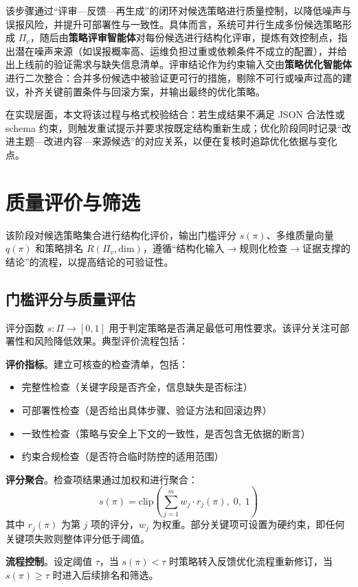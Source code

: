 该步骤通过“评审—反馈—再生成”的闭环对候选策略进行质量控制，以降低噪声与误报风险，并提升可部署性与一致性。具体而言，系统可并行生成多份候选策略形成 $\Pi_v$，随后由\textbf{策略评审智能体}对每份候选进行结构化评审，提炼有效控制点，指出潜在噪声来源（如误报概率高、运维负担过重或依赖条件不成立的配置），并给出上线前的验证需求与缺失信息清单。评审结论作为约束输入交由\textbf{策略优化智能体}进行二次整合：合并多份候选中被验证更可行的措施，剔除不可行或噪声过高的建议，补齐关键前置条件与回滚方案，并输出最终的优化策略。

在实现层面，本文将该过程与格式校验结合：若生成结果不满足 JSON 合法性或 schema 约束，则触发重试提示并要求按既定结构重新生成；优化阶段同时记录“改进主题—改进内容—来源候选”的对应关系，以便在复核时追踪优化依据与变化点。

\section{质量评价与筛选}

该阶段对候选策略集合进行结构化评价，输出门槛评分 $s(\pi)$、多维质量向量 $q(\pi)$ 和策略排名 $R(\Pi_v, \text{dim})$，遵循“结构化输入$\to$规则化检查$\to$证据支撑的结论”的流程，以提高结论的可验证性。

\subsection{门槛评分与质量评估}

评分函数 $s: \Pi \to [0,1]$ 用于判定策略是否满足最低可用性要求。该评分关注可部署性和风险降低效果。典型评价流程包括：

	\textbf{评价指标}。建立可核查的检查清单，包括：
\begin{itemize}
    \item 完整性检查（关键字段是否齐全，信息缺失是否标注）
    \item 可部署性检查（是否给出具体步骤、验证方法和回滚边界）
    \item 一致性检查（策略与安全上下文的一致性，是否包含无依据的断言）
    \item 约束合规检查（是否符合临时防控的适用范围）
\end{itemize}

	\textbf{评分聚合}。检查项结果通过加权和进行聚合：
\[
s(\pi)=\mathrm{clip}\left(\sum_{j=1}^{m} w_j\cdot r_j(\pi),\;0,\;1\right)
\]
其中 $r_j(\pi)$ 为第 $j$ 项的评分，$w_j$ 为权重。部分关键项可设置为硬约束，即任何关键项失败则整体评分低于阈值。

	\textbf{流程控制}。设定阈值 $\tau$，当 $s(\pi) < \tau$ 时策略转入反馈优化流程重新修订，当 $s(\pi) \geq \tau$ 时进入后续排名和筛选。

